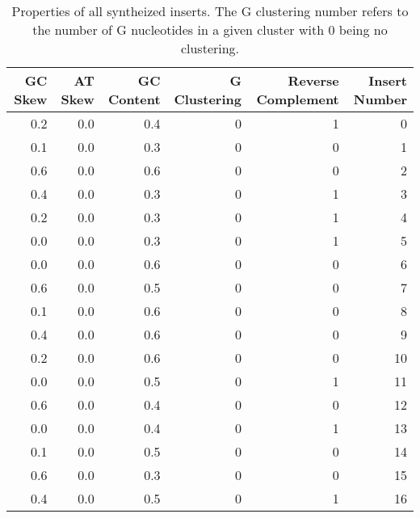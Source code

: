 \begin{table}[H]
\centering
\caption{Properties of all syntheized inserts. The G clustering number refers to the number of G nucleotides in a given cluster with 0 being no clustering.}
\label{table:1}
\begin{tabular}{rrrrrr}
\toprule
 GC Skew &  AT Skew &  GC Content &  G Clustering &  Reverse Complement &  Insert Number \\
\midrule
     0.2 &      0.0 &         0.4 &             0 &                   1 &              0 \\
     0.1 &      0.0 &         0.3 &             0 &                   0 &              1 \\
     0.6 &      0.0 &         0.6 &             0 &                   0 &              2 \\
     0.4 &      0.0 &         0.3 &             0 &                   1 &              3 \\
     0.2 &      0.0 &         0.3 &             0 &                   1 &              4 \\
     0.0 &      0.0 &         0.3 &             0 &                   1 &              5 \\
     0.0 &      0.0 &         0.6 &             0 &                   0 &              6 \\
     0.6 &      0.0 &         0.5 &             0 &                   0 &              7 \\
     0.1 &      0.0 &         0.6 &             0 &                   0 &              8 \\
     0.4 &      0.0 &         0.6 &             0 &                   0 &              9 \\
     0.2 &      0.0 &         0.6 &             0 &                   0 &             10 \\
     0.0 &      0.0 &         0.5 &             0 &                   1 &             11 \\
     0.6 &      0.0 &         0.4 &             0 &                   0 &             12 \\
     0.0 &      0.0 &         0.4 &             0 &                   1 &             13 \\
     0.1 &      0.0 &         0.5 &             0 &                   0 &             14 \\
     0.6 &      0.0 &         0.3 &             0 &                   0 &             15 \\
     0.4 &      0.0 &         0.5 &             0 &                   1 &             16 \\

\end{tabular}
\end{table}
